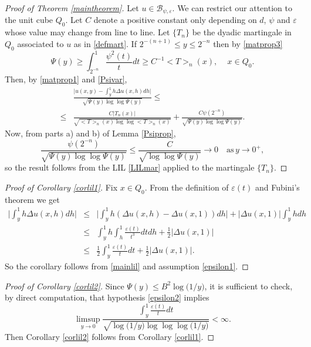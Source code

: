 \documentclass[11pt,letterpaper]{amsart}
\theoremstyle{definition}
\numberwithin{equation}{section}
\begin{document}
\begin{proof}[Proof of Theorem \ref{maintheorem}]

Let  $u\in  \mathcal{B}_{\psi , \varepsilon }$. We can restrict our attention to the unit cube $Q_0$. Let $C$ denote a positive constant only depending on $d$, $\psi$ and $\varepsilon$ whose value may change from line to line. Let  $\{ T_n \}$ be the dyadic martingale in $Q_0$ associated to $u$ as in \eqref{defmart}. If  $2^{-(n+1)} \leq y \leq 2^{-n}$ then by \eqref{matprop3}
\begin{equation}\label{Psivar}
\Psi (y)  \geq  \int_{2^{-n}}^1 \frac{\psi^2 (t)}{t} dt \geq C^{-1} <T>_n (x) , \, 
\quad x\in Q_0 . 
\end{equation}
Then, by \eqref{matprop1} and \eqref{Psivar}, 
\begin{align*}
& \frac{\displaystyle \big| u(x,y) - \int_y^1 h \Delta u(x,h) dh  \big|}{ \sqrt{\Psi(y) \log \log \Psi (y)}} \leq \\ 
\leq & \frac{C|T_n (x)|}{\sqrt{<T>_n (x) \log \log <T>_n (x)}}  +  \frac{ C \psi (2^{-n})}{ \sqrt{\Psi(y) \log \log \Psi (y)}} .   
\end{align*}
Now, from parts a) and b) of Lemma \ref{Psiprop},
$$
\frac{ \psi (2^{-n})}{\sqrt{\Psi(y) \log \log \Psi (y)}} \leq \frac{C}{\sqrt{\log \log \Psi (y)}} \to 0 \quad \text{as} \, y \to 0^+ , 
$$
so the result follows from the LIL \eqref{LILmar} applied to the martingale $\{ T_n \}$. 
\end{proof}


\begin{proof}[Proof of Corollary \ref{corlil1}]
Fix $x\in Q_0$. From the definition of $\varepsilon (t)$ and Fubini's theorem we get
\begin{eqnarray*}
\Big | \int_y^1 h \Delta u(x,h)dh   \Big | & \leq & \displaystyle \Big |  \int_y^1 h ( \Delta u(x,h) - \Delta u(x,1) ) dh  \Big | + |\Delta u(x,1)| \int_y^1 h dh  \\
& \leq & \displaystyle \int_y^1  h \int_h^1 \frac{\varepsilon (t)}{t^3} dt dh + \frac{1}{2} |\Delta u(x,1)| \\
& \leq & \frac{1}{2}\int_y^1 \frac{\varepsilon (t)}{t} dt +  \frac{1}{2} |\Delta u(x,1)| . 
\end{eqnarray*}
So the corollary follows from \eqref{mainlil} and assumption \eqref{epsilon1}.
\end{proof}

\begin{proof}[Proof of Corollary \ref{corlil2}]
Since  $\Psi (y) \leq B^2 \log \big ( 1/y \big ) $, it is sufficient to check, by direct computation,  that hypothesis \eqref{epsilon2} implies
$$
\limsup_{y\to 0} \frac{\displaystyle \int_y^1 \frac{\varepsilon (t)}{t} dt}{\sqrt{\log \big ( 1/y \big ) \log \log \log \big ( 1/y \big )}} < \infty . 
$$
Then Corollary \ref{corlil2} follows from Corollary \ref{corlil1}.
\end{proof}
\end{document}
